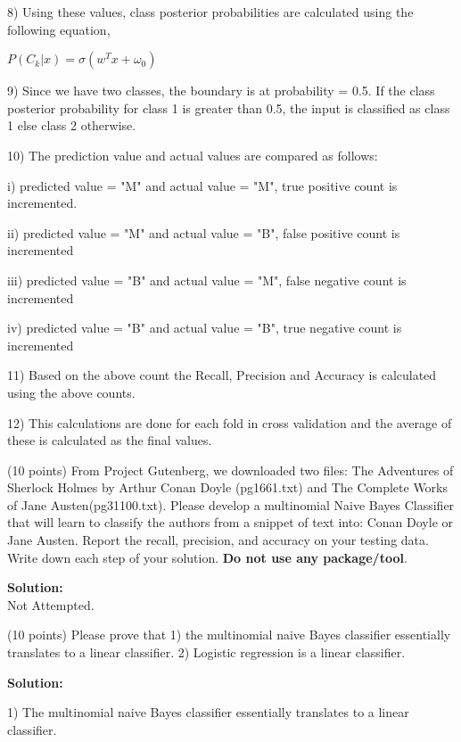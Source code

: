 \documentclass{exam}
\begin{document}
\begin{questions}
8) Using these values, class posterior probabilities are calculated using the following equation,

$P( C_{k} | x) = \sigma (w^{T} x + \omega_{0}) $

9) Since we have two classes, the boundary is at probability = 0.5. If the class posterior probability for class 1 is greater than 0.5, the input is classified as class 1 else class 2 otherwise.

10) The prediction value and actual values are compared as follows:

i) predicted value = "M" and actual value = "M", true positive count is incremented.

ii) predicted value = "M" and actual value = "B", false positive count is incremented

iii) predicted value = "B" and actual value = "M", false negative count is incremented

iv) predicted value = "B" and actual value = "B", true negative count is incremented

11) Based on the above count the Recall, Precision and Accuracy is calculated using the above counts.

12) This calculations are done for each fold in cross validation and the average of these is calculated as the final values.

\newpage
{} (10 points) From Project Gutenberg, we downloaded two files: The Adventures of Sherlock Holmes by Arthur Conan Doyle (pg1661.txt) and The Complete Works of Jane Austen(pg31100.txt). Please develop a multinomial Naive Bayes Classifier that will learn to classify the authors from a snippet of text into: Conan Doyle or Jane Austen. Report the recall, precision, and accuracy  on your testing data. Write down each step of your solution. \textbf{Do not use any package/tool}. 

\vspace{5em}

\textbf{Solution:}\\

Not Attempted.

\newpage
{} (10 points) Please prove that 1) the multinomial naive Bayes classifier essentially translates to a linear classifier. 2) Logistic regression is a linear classifier.


\textbf{Solution:}

1) The multinomial naive Bayes classifier essentially translates to a linear classifier. 


\end{questions}
\end{document}
